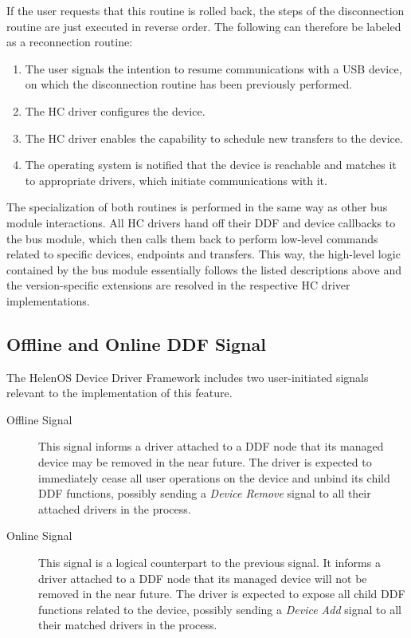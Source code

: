 If the user requests that this routine is rolled back, the steps of the
disconnection routine are just executed in reverse order. The following can
therefore be labeled as a reconnection routine:
~
\begin{enumerate}
	\item The user signals the intention to resume communications with a USB
	device, on which the disconnection routine has been previously performed.
	\item The HC driver configures the device.
	\item The HC driver enables the capability to schedule new transfers to the
	device.
	\item The operating system is notified that the device is reachable and
	matches it to appropriate drivers, which initiate communications with it.
\end{enumerate}

The specialization of both routines is performed in the same way as other bus
module interactions. All HC drivers hand off their DDF and device callbacks to
the bus module, which then calls them back to perform low-level commands related
to specific devices, endpoints and transfers. This way, the high-level logic
contained by the bus module essentially follows the listed descriptions above
and the version-specific extensions are resolved in the respective HC driver
implementations.


\subsection{Offline and Online DDF Signal}

The HelenOS Device Driver Framework includes two user-initiated signals
relevant to the implementation of this feature.

\begin{description}
	\item[Offline Signal]
		This signal informs a driver attached to a DDF node that its managed
		device may be removed in the near future. The driver is expected to
		immediately cease all user operations on the device and unbind its
		child DDF functions, possibly sending a \textit{Device Remove} signal
		to all their attached drivers in the process.

	\item[Online Signal]
		This signal is a logical counterpart to the previous signal.
		It informs a driver attached to a DDF node that its managed device will
		not be removed in the near future. The driver is expected to expose all
		child DDF functions related to the device, possibly sending a
		\textit{Device Add} signal to all their matched drivers in the process.
\end{description}

